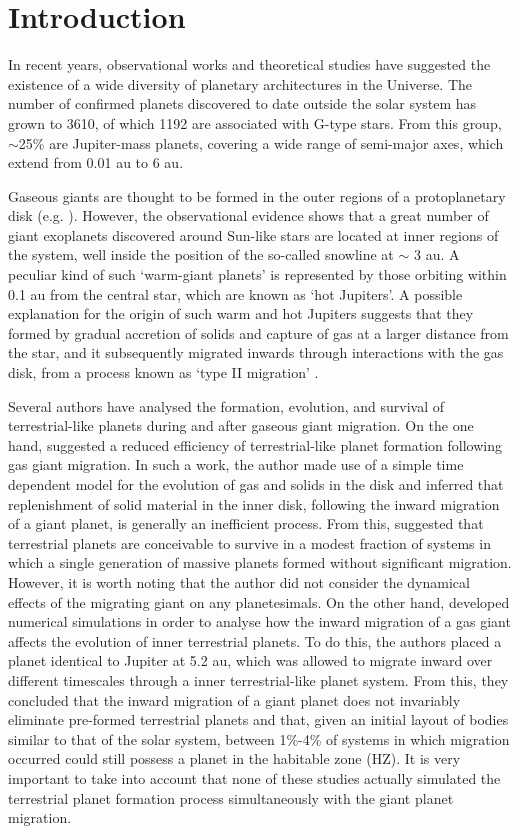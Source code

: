 \documentclass{aa}
\begin{document}
\section{Introduction}

In recent years, observational works \citep{Cumming2008,Howard2013} and theoretical studies \citep{Mordasini2009,Ida2013}
have suggested the existence of a wide diversity of planetary
architectures in the Universe. The number of confirmed planets discovered to date outside the solar system has grown to 3610, of which 1192 are associated with G-type stars. From this group, $\sim$25\% are Jupiter-mass planets, covering a wide range of semi-major axes, which extend from 0.01 au to 6 au.

Gaseous giants are thought to be formed in the outer regions of a protoplanetary disk (e.g. \citet{Pollack1996}). However, the observational evidence shows that a great number of giant exoplanets discovered around Sun-like stars are located at inner regions of the system, well inside the position of the so-called snowline at $\sim$ 3 au. A peculiar kind of such `warm-giant planets' is represented by those orbiting within 0.1 au from the central star, which are known as `hot Jupiters'. A possible explanation for the origin of such warm and hot Jupiters
suggests that they formed by gradual accretion of solids and capture of gas at a larger distance from the star, and it subsequently migrated inwards through interactions with the gas disk, from a process known as `type II migration' \citep{Lin1996}.

Several authors have analysed the formation, evolution, and survival of terrestrial-like planets during and after
gaseous giant migration. On the one hand, \citet{Armitage2003} suggested a reduced efficiency of terrestrial-like planet formation
following gas giant migration. In such a work, the author made use of a simple time dependent model for the evolution
of gas and solids in the disk and inferred that replenishment of solid material in the inner disk, following the inward
migration of a giant planet, is generally an inefficient process. From this, \citet{Armitage2003} suggested that terrestrial planets
are conceivable to survive in a modest fraction of systems in which a single generation of massive planets formed without significant
migration. However, it is worth noting that the author did not consider the dynamical effects of the migrating giant
on any planetesimals. On the other hand, \citet{Mandell2003} developed numerical simulations in order to analyse
how the inward migration of a gas giant affects the evolution of inner terrestrial planets. To do this, the authors placed
a planet identical to Jupiter at 5.2 au, which was allowed to migrate inward over different timescales through a inner
terrestrial-like planet system. From this, they concluded that the inward migration of a giant planet does not invariably
eliminate pre-formed terrestrial planets and that, given an initial layout of bodies similar to that of the solar system,
between 1\%-4\% of systems in which migration occurred could still possess a planet in the habitable zone (HZ). It is very important
to take into account that none of these studies actually simulated the terrestrial planet formation process simultaneously
with the giant planet migration.
\end{document}
